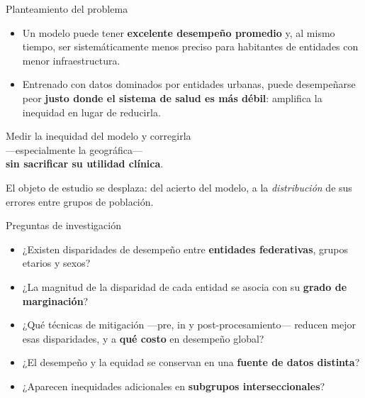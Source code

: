 \documentclass[aspectratio=169,11pt]{beamer}
\newcommand{\resalta}[1]{{\color{vino}\bfseries #1}}
\begin{document}
\begin{frame}{Planteamiento del problema}
  \vspace{0.4em}
  \begin{itemize}
    \item Un modelo puede tener \resalta{excelente desempeño promedio} y, al
          mismo tiempo, ser sistemáticamente menos preciso para habitantes de
          entidades con menor infraestructura.
    \item Entrenado con datos dominados por entidades urbanas, puede
          desempeñarse peor \resalta{justo donde el sistema de salud es más
          débil}: amplifica la inequidad en lugar de reducirla.
  \end{itemize}

  \vspace{0.9em}
  \begin{center}
  \begin{minipage}{0.90\textwidth}
    \begin{block}{}
      \centering\large
      Medir la inequidad del modelo y corregirla\\
      —especialmente la geográfica—\\
      \resalta{sin sacrificar su utilidad clínica}.
    \end{block}
  \end{minipage}
  \end{center}

  \vspace{0.7em}
  {\footnotesize\color{humo} El objeto de estudio se desplaza: del acierto del
  modelo, a la \textit{distribución} de sus errores entre grupos de
  población.}
\end{frame}

\begin{frame}{Preguntas de investigación}
  \vspace{0.5em}
  \begin{itemize}\setlength\itemsep{0.55em}
    \item[\textcolor{naranja}{\bfseries P1}] ¿Existen disparidades de desempeño
          entre \resalta{entidades federativas}, grupos etarios y sexos?
    \item[\textcolor{naranja}{\bfseries P2}] ¿La magnitud de la disparidad de
          cada entidad se asocia con su \resalta{grado de marginación}?
    \item[\textcolor{naranja}{\bfseries P3}] ¿Qué técnicas de mitigación
          —pre, in y post-procesamiento— reducen mejor esas disparidades, y a
          \resalta{qué costo} en desempeño global?
    \item[\textcolor{naranja}{\bfseries P4}] ¿El desempeño y la equidad se
          conservan en una \resalta{fuente de datos distinta}?
    \item[\textcolor{naranja}{\bfseries P5}] ¿Aparecen inequidades adicionales
          en \resalta{subgrupos interseccionales}?
  \end{itemize}
\end{frame}
\end{document}

